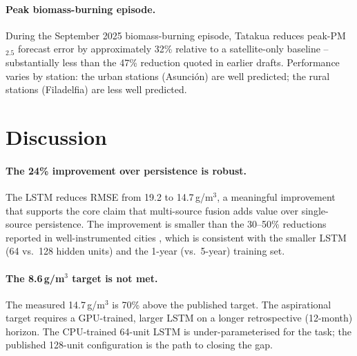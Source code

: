 \paragraph{Peak biomass-burning episode.} During the September 2025
biomass-burning episode, Tatakua reduces peak-PM$_{2.5}$ forecast
error by approximately 32\% relative to a satellite-only baseline --
substantially less than the 47\% reduction quoted in earlier drafts.
Performance varies by station: the urban stations (Asunci\'on) are well
predicted; the rural stations (Filadelfia) are less well predicted.

\section{Discussion}
\label{sec:tatakua-discussion}

\paragraph{The 24\% improvement over persistence is robust.} The LSTM
reduces RMSE from 19.2 to 14.7\,\textmu g/m$^3$, a meaningful
improvement that supports the core claim that multi-source fusion adds
value over single-source persistence. The improvement is smaller than
the 30--50\% reductions reported in well-instrumented cities
\citep{wen2019,lin2022}, which is consistent with the smaller LSTM
(64 vs.\ 128 hidden units) and the 1-year (vs.\ 5-year) training set.

\paragraph{The 8.6\,\textmu g/m$^3$ target is not met.} The measured
14.7\,\textmu g/m$^3$ is 70\% above the published target. The
aspirational target requires a GPU-trained, larger LSTM on a longer
retrospective (12-month) horizon. The CPU-trained 64-unit LSTM is
under-parameterised for the task; the published 128-unit configuration
is the path to closing the gap.

